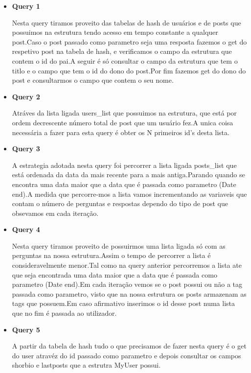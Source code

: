 \documentclass[a4paper,10pt]{article}
\begin{document}
    \begin{itemize}
    
    \item \textbf{Query 1}
    
    \quad\quad Nesta query tiramos proveito das tabelas de hash de usu\'arios e de posts que possuimos na estrutura tendo acesso em tempo constante a qualquer post.Caso o post passado como parametro seja uma resposta fazemos o get do respetivo post na tabela de hash, e verificamos o campo da estrutura que contem o id do pai.A seguir \'e s\'o consultar o campo da estrutura que tem o titlo e o campo que tem o id do dono do post.Por fim fazemos get do dono do post e consultarmos o campo que contem o seu nome.
    
    \item \textbf{Query 2}
    
    \quad\quad Atráves da lista ligada users\_list que possuimos na estrutura, que est\'a por ordem decrescente n\'umero total de post que um usu\'ario fez.A unica coisa necess\'aria a fazer para esta query \'e obter os N primeiros id's desta lista.
    
    \item \textbf{Query 3}
    
    \quad\quad A estrategia adotada nesta query foi percorrer a lista ligada posts\_list que est\'a ordenada da data da mais recente para a mais antiga.Parando quando se encontra uma data maior que a data que \'e passada como parametro (Date end).A medida que percorre-mos a lista vamos incrementando as variaveis que contam o n\'umero de perguntas e respostas dependo do tipo de post que obsevamos em cada  itera\c{c}\~ao.

  \item \textbf{Query 4}
    
    \quad\quad Nesta query tiramos proveito de possuirmos uma lista ligada s\'o com as perguntas na nossa estrutura.Assim o tempo de percorrer a lista \'e consideravelmente menor.Tal como na query anterior percorremos a lista ate que seja encontrada uma data maior que a data que \'e passada como parametro (Date end).Em cada itera\c{c}\~ao vemos se o post possui ou não a tag passada como parametro, visto que na nossa estrutura os posts armazenam as tags que possuem.Em caso afirmativo inserimos o id desse post numa lista que no fim \'e passada ao utilizador.

  \item \textbf{Query 5}
    
    \quad\quad A partir da tabela de hash tudo o que precisamos de fazer nesta query \'e o get do user atrav\'ez do id passado como parametro e depois consultar os campos shorbio e lastposts que a estrutra MyUser possui.


\end{itemize}
\end{document}
